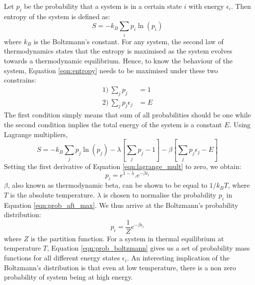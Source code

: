 Let $p_i$ be the probability that a system is in a certain state $i$ with energy $\epsilon_i$. Then entropy of the system is defined as:
\begin{equation}
    S = -k_B\sum_{i} p_i \ln(p_i)
    \label{eqn:entropy}
\end{equation}
where $k_B$ is the Boltzmann's constant. For any system, the second law of thermodynamics states that the entropy is maximised as the system evolves towards a  thermodynamic equilibrium. Hence, to know the behaviour of the system, Equation \ref{eqn:entropy} needs to be maximised under these two constrains:
\begin{equation}
    \begin{split}
        1)\ \sum_j p_j &= 1 \\
        2)\ \sum_j p_j \epsilon_j &= E
    \end{split}
\end{equation}
The first condition simply means that sum of all probabilities should be one while the second condition implies the total energy of the system is a constant $E$. Using Lagrange multipliers,  
\begin{equation}
    S = -k_B\sum_j p_j \ln(p_j) - \lambda [\sum_j p_j -1 ] - \beta[\sum_j p_j \epsilon_j - E]
    \label{eqn:lagrange_mult}
\end{equation}
Setting the first derivative of Equation \ref{eqn:lagrange_mult} to zero, we obtain:
\begin{equation}
    p_i = e^{1-\lambda}.e^{-\beta \epsilon_i}
    \label{eqn:prob_aft_max}
\end{equation}
$\beta$, also known as thermodynamic beta, can be shown to be equal to $1/k_B T$, where $T$ is the absolute temperature. $\lambda$ is chosen to normalise the probability $p_i$ in Equation \ref{eqn:prob_aft_max}. We thus arrive at the Boltzmann's probability distribution:
\begin{equation}
    p_i = \frac{1}{Z} e^{-\beta \epsilon_i}
    \label{eqn:prob_boltzmann}
\end{equation}
where $Z$ is the partition function. For a system in thermal equilibrium at temperature $T$, Equation \ref{eqn:prob_boltzmann} gives us a set of probability mass functions for all different energy states $\epsilon_i$. An interesting implication of the Boltzmann's distribution is that even at low temperature, there is a non zero probability of system being at high energy.  


